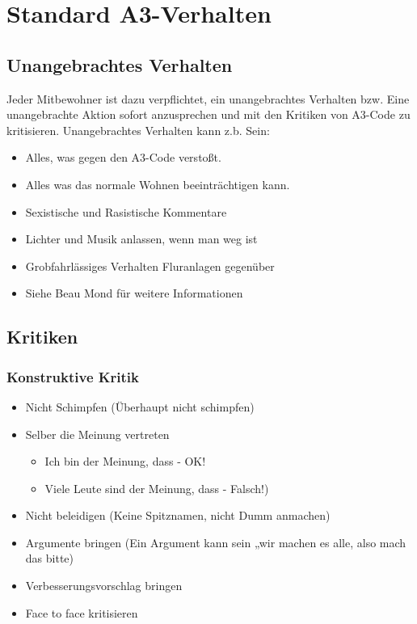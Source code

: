 \documentclass[10pt,a4paper,final]{article}
\begin{document}
\section{Standard A3-Verhalten}
\subsection{Unangebrachtes Verhalten}
Jeder Mitbewohner ist dazu verpflichtet, ein unangebrachtes Verhalten bzw. Eine unangebrachte Aktion sofort anzusprechen und mit den Kritiken von A3-Code zu kritisieren. Unangebrachtes Verhalten kann z.b. Sein:

\begin{itemize}
\item Alles, was gegen den A3-Code verstoßt. 
\item Alles was das normale Wohnen beeinträchtigen kann.
\item Sexistische und Rasistische Kommentare
\item Lichter und Musik anlassen, wenn man weg ist
\item Grobfahrlässiges Verhalten Fluranlagen gegenüber
\item Siehe Beau Mond für weitere Informationen

\end{itemize}



\subsection{Kritiken}
\subsubsection{Konstruktive Kritik}
\begin{itemize}
\item Nicht Schimpfen (Überhaupt nicht schimpfen)
\item Selber die Meinung vertreten 

\begin{itemize}
\item Ich bin der Meinung, dass - OK!
\item Viele Leute sind der Meinung, dass - Falsch!)
\end{itemize}

\item Nicht beleidigen (Keine Spitznamen, nicht Dumm anmachen)
\item Argumente bringen (Ein Argument kann sein „wir machen es alle, also mach das bitte)
\item Verbesserungsvorschlag bringen
\item Face to face kritisieren
\end{itemize}
\end{document}
